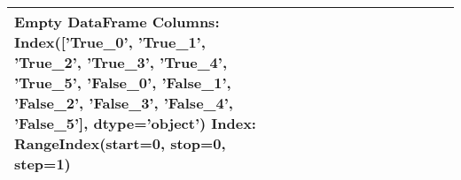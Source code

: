 \begin{tabular}{lrrrrrrrrrrrr}
\toprule
Empty DataFrame
Columns: Index(['True\_0', 'True\_1', 'True\_2', 'True\_3', 'True\_4', 'True\_5', 'False\_0',
       'False\_1', 'False\_2', 'False\_3', 'False\_4', 'False\_5'],
      dtype='object')
Index: RangeIndex(start=0, stop=0, step=1) \\ \hline
\bottomrule
\end{tabular}
